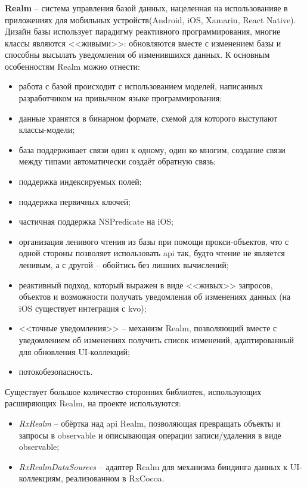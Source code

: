 \subsubsection{}
\label{sec:development:arch:ios:realm}

\textbf{Realm} -- система управления базой данных, нацеленная на использованияе в приложениях для мобильных устройств(Android, iOS, Xamarin, React Native). Дизайн базы использует парадигму реактивного программирования, многие классы являются <<живыми>>: обновляются вместе с изменением базы и способны высылать уведомления об изменившихся данных. К основным особенностям Realm можно отнести:

\begin{itemize}
	\item работа с базой происходит с использованием моделей, написанных разработчиком на привычном языке программирования;
	\item данные хранятся в бинарном формате, схемой для которого выступают классы-модели;
	\item база поддерживает связи один к одному, один ко многим, создание связи между типами автоматически создаёт обратную связь;
	\item поддержка индексируемых полей;
	\item поддержка первичных ключей;
	\item частичная поддержка NSPredicate на iOS;
	\item организация ленивого чтения из базы при помощи прокси-объектов, что с одной стороны позволяет использовать \gls{api} так, будто чтение не является ленивым, а с другой -- обойтись без лишних вычислений;
	\item реактивный подход, который выражен в виде <<живых>> запросов, объектов и возможности получать уведомления об изменениях данных (на iOS существует интеграция с \gls{kvo});
	\item <<точные уведомления>> -- механизм Realm, позволяющий вместе с уведомлением об изменениях получить список изменений, адаптированный для обновления UI-коллекций;
	\item потокобезопасность.
\end{itemize}

Существует большое количество сторонних библиотек, использующих расширяющих Realm, на проекте используются:

\begin{itemize}
	\item \emph{RxRealm} -- обёртка над \gls{api} Realm, позволяющая превращать объекты и запросы в \gls{observable} и описывающая операции записи/удаления в виде \gls{observable};
	\item \emph{RxRealmDataSources} -- адаптер Realm для механизма биндинга данных к UI-коллекциям, реализованном в RxCocoa.
\end{itemize}